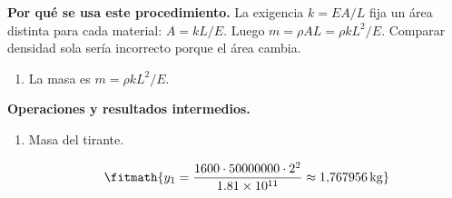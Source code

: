 \noindent\textbf{Por qué se usa este procedimiento.} La exigencia $k=EA/L$ fija un área distinta para cada material: $A=kL/E$. Luego $m=\rho AL=\rho kL^2/E$. Comparar densidad sola sería incorrecto porque el área cambia.

\begin{enumerate}

\item La masa es $m = \rho k L^2/E$.

\end{enumerate}

\noindent\textbf{Operaciones y resultados intermedios.}

\begin{enumerate}

\item Masa del tirante.

\[\fitmath{y_{1}=\frac{1600\cdot 50000000\cdot {2}^{2}}{1.81\times10^{11}}\approx 1{,}767956\,\mathrm{kg}}\]

\end{enumerate}
